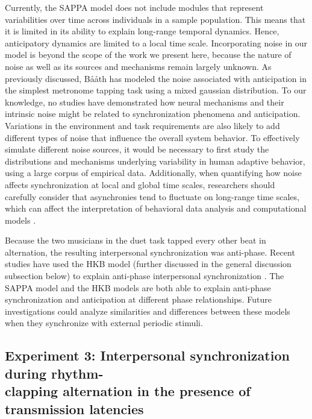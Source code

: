 \documentclass{report}
\begin{document}
Currently, the SAPPA model does not include modules that represent variabilities over time across individuals in a sample population. This means that it is limited in its ability to explain long-range temporal dynamics. Hence, anticipatory dynamics are limited to a local time scale. Incorporating noise in our model is beyond the scope of the work we present here, because the nature of noise as well as its sources and mechanisms remain largely unknown. As previously discussed, B\aa\aa th \cite{baaaath2016estimating} has modeled the noise associated with anticipation in the simplest metronome tapping task using a mixed gaussian distribution. To our knowledge, no studies have demonstrated how neural mechanisms and their intrinsic noise might be related to synchronization phenomena and anticipation. Variations in the environment and task requirements are also likely to add different types of noise that influence the overall system behavior. To effectively simulate different noise sources, it would be necessary to first study the distributions and mechanisms underlying variability in human adaptive behavior, using a large corpus of empirical data. Additionally, when quantifying how noise affects synchronization at local and global time scales, researchers should carefully consider that asynchronies tend to fluctuate on long-range time scales, which can affect the interpretation of behavioral data analysis and computational models \cite{torre2008distinct}.

Because the two musicians in the duet task tapped every other beat in alternation, the resulting interpersonal synchronization was anti-phase. Recent studies have used the HKB model \cite{haken1985theoretical} (further discussed in the general discussion subsection below) to explain anti-phase interpersonal synchronization \cite{duarte2012interpersonal, dumas2014human, kelso2009virtual}. The SAPPA model and the HKB models are both able to explain anti-phase synchronization and anticipation at different phase relationships. Future investigations could analyze similarities and differences between these models when they synchronize with external periodic stimuli.

\subsection{Experiment 3: Interpersonal synchronization during rhythm-\\ clapping alternation in the presence of transmission latencies}
\end{document}
